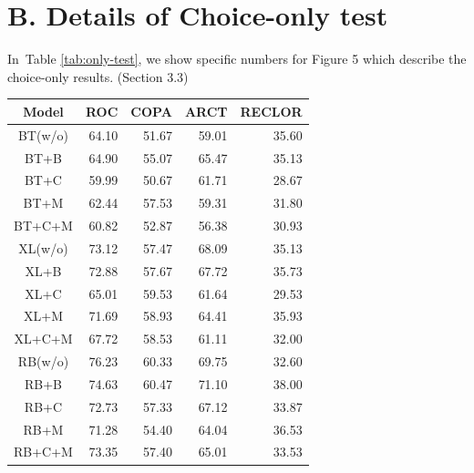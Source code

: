 \documentclass[runningheads]{llncs}
\newcommand{\secref}[1]{Section \ref{#1}}
\newcommand{\tabref}[1]{Table \ref{#1}}
\begin{document}
\section{B.   Details of Choice-only test}
In~\tabref{tab:only-test}, we show specific numbers for Figure 5 which describe 
the choice-only results. (Section 3.3)
\begin{table}[th]
\centering
\scriptsize
\begin{tabular}{c|rrrr}
\toprule
\textbf{Model} & \textbf{ROC} & \textbf{COPA} & \textbf{ARCT} & \textbf{RECLOR} \\ \midrule
BT(w/o)&64.10 &51.67 &59.01 &35.60 \\ \hline  
BT+B&64.90 &55.07 &65.47 &35.13 \\ \hline  
BT+C&59.99 &50.67 &61.71 &28.67 \\ \hline  
BT+M&62.44 &57.53 &59.31 &31.80 \\ \hline  
BT+C+M&60.82 &52.87 &56.38 &30.93 \\ \midrule 
XL(w/o)&73.12 &57.47 &68.09 &35.13 \\ \hline  
XL+B&72.88 &57.67 &67.72 &35.73 \\ \hline  
XL+C&65.01 &59.53 &61.64 &29.53 \\ \hline  
XL+M&71.69 &58.93 &64.41 &35.93 \\ \hline  
XL+C+M&67.72 &58.53 &61.11 &32.00 \\ \midrule 
RB(w/o)&76.23 &60.33 &69.75 &32.60 \\ \hline  
RB+B&74.63 &60.47 &71.10 &38.00 \\ \hline  
RB+C&72.73 &57.33 &67.12 &33.87 \\ \hline  
RB+M&71.28 &54.40 &64.04 &36.53 \\ \hline  
RB+C+M&73.35 &57.40 &65.01 &33.53 \\



\end{tabular}
\end{table}
\end{document}
